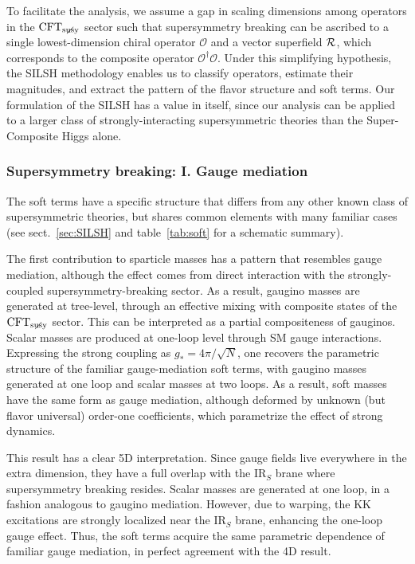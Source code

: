 \documentclass[a4paper,12pt]{article}
\def\sec#1{sect.~\ref{#1}}
\def\O{\mathcal{O}}
\def\CFTs{{\rm CFT}_ {{\rm susy}\! \! \! \! \! \! \! \!\diagup \,\,\,}}
\begin{document}
{{{{To facilitate the analysis, we assume a gap in scaling dimensions among operators in the $\CFTs$ sector such that supersymmetry breaking can be ascribed to a single lowest-dimension chiral operator $\O$ and a vector superfield $\cal R$, which corresponds to the composite operator $\O^\dagger \O$. Under this simplifying hypothesis, the SILSH methodology enables us to classify operators, estimate their magnitudes, and extract the pattern of the flavor structure and soft terms. Our formulation of the SILSH has a value in itself, since our analysis can be applied to a larger class of strongly-interacting supersymmetric theories than the Super-Composite Higgs alone.

\subsubsection*{Supersymmetry breaking: I. Gauge mediation}

The soft terms have a specific structure that differs from any other known class of supersymmetric theories, but shares common elements with many familiar cases (see \sec{sec:SILSH} and table~\ref{tab:soft} for a schematic summary). 

The first contribution to sparticle masses has a pattern that resembles gauge mediation, although the effect comes from direct interaction with the strongly-coupled supersymmetry-breaking sector. As a result, gaugino masses are generated at tree-level, through an effective mixing with composite states of the $\CFTs$ sector. This can be interpreted as a partial compositeness of gauginos. Scalar masses are produced at one-loop level through SM gauge interactions. Expressing the strong coupling as $g_*=4\pi/\sqrt{N}$, one recovers the parametric structure of the familiar gauge-mediation soft terms, with gaugino masses generated at one loop and scalar masses at two loops. As a result, soft masses have the same form as gauge mediation, although deformed by unknown (but flavor universal) order-one coefficients, which parametrize the effect of strong dynamics.

This result has a clear 5D interpretation. Since gauge fields live everywhere in the extra dimension, they have a full overlap with the IR$_S$ brane where supersymmetry breaking resides. Scalar masses are generated at one loop, in a fashion analogous to gaugino mediation. However, due to warping, the KK excitations are strongly localized near the IR$_S$ brane, enhancing the one-loop gauge effect. Thus, the soft terms acquire the same parametric dependence of familiar gauge mediation, in perfect agreement with the 4D result.

}}}}
\end{document}
